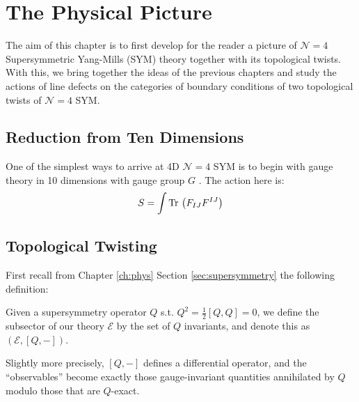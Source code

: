\chapter{The Physical Picture\label{ch:finale}}

The aim of this chapter is to first develop for the reader a picture of $\mathcal N = 4$ Supersymmetric Yang-Mills (SYM) theory together with its topological twists. With this, we bring together the ideas of the previous chapters and study the actions of line defects on the categories of boundary conditions of two topological twists of $\mathcal N=4$ SYM.

\section{Reduction from Ten Dimensions} %
\label{sec:reduction_from_ten_dimensions}


One of the simplest ways to arrive at 4D $\mathcal N=4$ SYM is to begin with gauge theory in 10 dimensions with gauge group $G$ \cite{kapustin2006}. The action here is:
\begin{equation}
	S = \int \mathrm{Tr}\, \left(F_{IJ} F^{IJ}\right)
\end{equation}


\section{Topological Twisting} %
\label{sec:topological_twisting}

	First recall from Chapter \ref{ch:phys} Section \ref{sec:supersymmetry} the following definition: 
	\begin{defn}[Subsector]
		Given a supersymmetry operator $Q$ s.t. $Q^2 = \frac{1}{2} [Q, Q] = 0$, we define the subsector of our theory $\mathcal E$ by the set of $Q$ invariants, and denote this as $(\mathcal E, [Q, -])$.
		
		Slightly more precisely, $[Q, -]$ defines a differential operator, and the ``observables'' become exactly those gauge-invariant quantities annihilated by $Q$ modulo those that are $Q$-exact.
	\end{defn}

